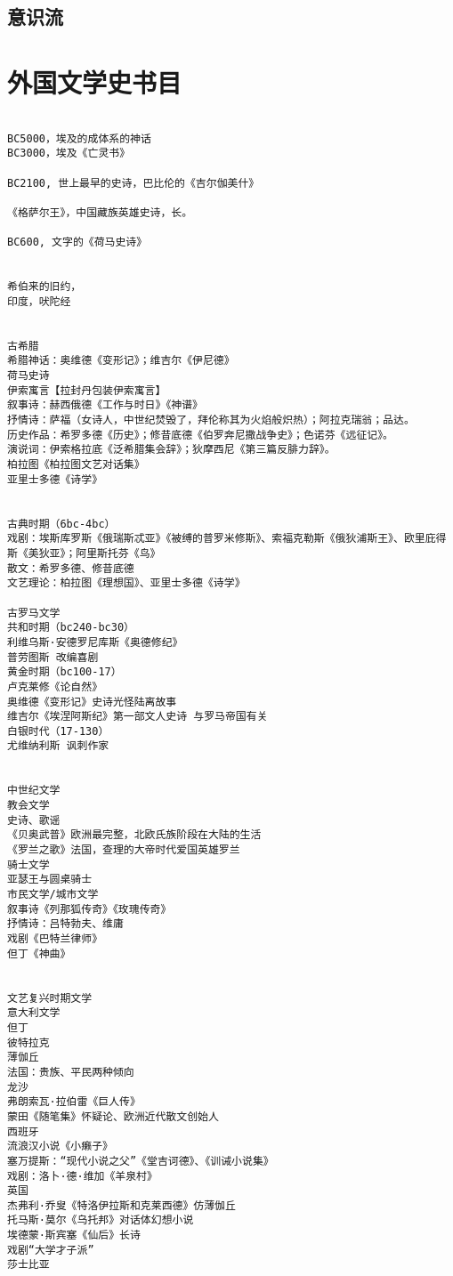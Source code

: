 \documentclass[UTF8]{../../RepresentationUniverse}
\begin{document}
\section{意识流}




\chapter{外国文学史书目}

\begin{lstlisting}

BC5000，埃及的成体系的神话
BC3000，埃及《亡灵书》

BC2100, 世上最早的史诗，巴比伦的《吉尔伽美什》

《格萨尔王》，中国藏族英雄史诗，长。

BC600, 文字的《荷马史诗》


希伯来的旧约，
印度，吠陀经


古希腊
希腊神话：奥维德《变形记》；维吉尔《伊尼德》
荷马史诗
伊索寓言【拉封丹包装伊索寓言】
叙事诗：赫西俄德《工作与时日》《神谱》
抒情诗：萨福（女诗人，中世纪焚毁了，拜伦称其为火焰般炽热）；阿拉克瑞翁；品达。
历史作品：希罗多德《历史》；修昔底德《伯罗奔尼撒战争史》；色诺芬《远征记》。
演说词：伊索格拉底《泛希腊集会辞》；狄摩西尼《第三篇反腓力辞》。
柏拉图《柏拉图文艺对话集》
亚里士多德《诗学》


古典时期（6bc-4bc）
戏剧：埃斯库罗斯《俄瑞斯忒亚》《被缚的普罗米修斯》、索福克勒斯《俄狄浦斯王》、欧里庇得斯《美狄亚》；阿里斯托芬《鸟》
散文：希罗多德、修昔底德
文艺理论：柏拉图《理想国》、亚里士多德《诗学》

古罗马文学
共和时期（bc240-bc30）
利维乌斯·安德罗尼库斯《奥德修纪》
普劳图斯 改编喜剧
黄金时期（bc100-17）
卢克莱修《论自然》
奥维德《变形记》史诗光怪陆离故事
维吉尔《埃涅阿斯纪》第一部文人史诗 与罗马帝国有关
白银时代（17-130）
尤维纳利斯 讽刺作家


中世纪文学
教会文学
史诗、歌谣
《贝奥武普》欧洲最完整，北欧氏族阶段在大陆的生活
《罗兰之歌》法国，查理的大帝时代爱国英雄罗兰
骑士文学
亚瑟王与圆桌骑士
市民文学/城市文学
叙事诗《列那狐传奇》《玫瑰传奇》
抒情诗：吕特勃夫、维庸
戏剧《巴特兰律师》
但丁《神曲》


文艺复兴时期文学
意大利文学
但丁
彼特拉克
薄伽丘
法国：贵族、平民两种倾向
龙沙
弗朗索瓦·拉伯雷《巨人传》
蒙田《随笔集》怀疑论、欧洲近代散文创始人
西班牙
流浪汉小说《小癞子》
塞万提斯：“现代小说之父”《堂吉诃德》、《训诫小说集》
戏剧：洛卜·德·维加《羊泉村》
英国
杰弗利·乔叟《特洛伊拉斯和克莱西德》仿薄伽丘
托马斯·莫尔《乌托邦》对话体幻想小说
埃德蒙·斯宾塞《仙后》长诗
戏剧“大学才子派”
莎士比亚



\end{lstlisting}
\end{document}
